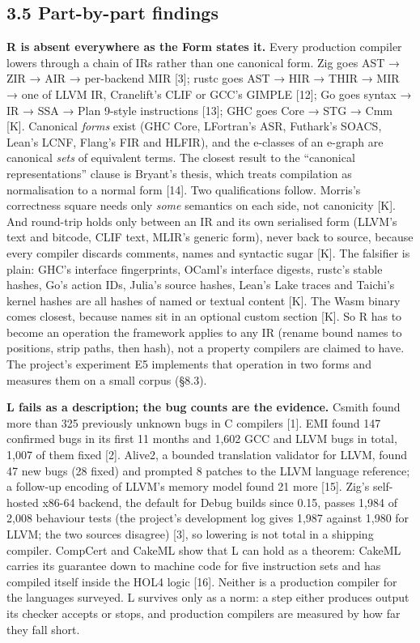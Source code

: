 \documentclass[10pt,letterpaper]{article}
\begin{document}
\subsection{3.5 Part-by-part findings}\label{part-by-part-findings}

\textbf{R is absent everywhere as the Form states it.} Every production
compiler lowers through a chain of IRs rather than one canonical form.
Zig goes AST → ZIR → AIR → per-backend MIR {[}3{]}; rustc goes AST → HIR
→ THIR → MIR → one of LLVM IR, Cranelift's CLIF or GCC's GIMPLE
{[}12{]}; Go goes syntax → IR → SSA → Plan 9-style instructions
{[}13{]}; GHC goes Core → STG → Cmm {[}K{]}. Canonical \emph{forms}
exist (GHC Core, LFortran's ASR, Futhark's SOACS, Lean's LCNF, Flang's
FIR and HLFIR), and the e-classes of an e-graph are canonical
\emph{sets} of equivalent terms. The closest result to the ``canonical
representations'' clause is Bryant's thesis, which treats compilation as
normalisation to a normal form {[}14{]}. Two qualifications follow.
Morris's correctness square needs only \emph{some} semantics on each
side, not canonicity {[}K{]}. And round-trip holds only between an IR
and its own serialised form (LLVM's text and bitcode, CLIF text, MLIR's
generic form), never back to source, because every compiler discards
comments, names and syntactic sugar {[}K{]}. The falsifier is plain:
GHC's interface fingerprints, OCaml's interface digests, rustc's stable
hashes, Go's action IDs, Julia's source hashes, Lean's Lake traces and
Taichi's kernel hashes are all hashes of named or textual content
{[}K{]}. The Wasm binary comes closest, because names sit in an optional
custom section {[}K{]}. So R has to become an operation the framework
applies to any IR (rename bound names to positions, strip paths, then
hash), not a property compilers are claimed to have. The project's
experiment E5 implements that operation in two forms and measures them
on a small corpus (§8.3).

\textbf{L fails as a description; the bug counts are the evidence.}
Csmith found more than 325 previously unknown bugs in C compilers
{[}1{]}. EMI found 147 confirmed bugs in its first 11 months and 1,602
GCC and LLVM bugs in total, 1,007 of them fixed {[}2{]}. Alive2, a
bounded translation validator for LLVM, found 47 new bugs (28 fixed) and
prompted 8 patches to the LLVM language reference; a follow-up encoding
of LLVM's memory model found 21 more {[}15{]}. Zig's self-hosted x86-64
backend, the default for Debug builds since 0.15, passes 1,984 of 2,008
behaviour tests (the project's development log gives 1,987 against 1,980
for LLVM; the two sources disagree) {[}3{]}, so lowering is not total in
a shipping compiler. CompCert and CakeML show that L can hold as a
theorem: CakeML carries its guarantee down to machine code for five
instruction sets and has compiled itself inside the HOL4 logic {[}16{]}.
Neither is a production compiler for the languages surveyed. L survives
only as a norm: a step either produces output its checker accepts or
stops, and production compilers are measured by how far they fall short.
\end{document}
